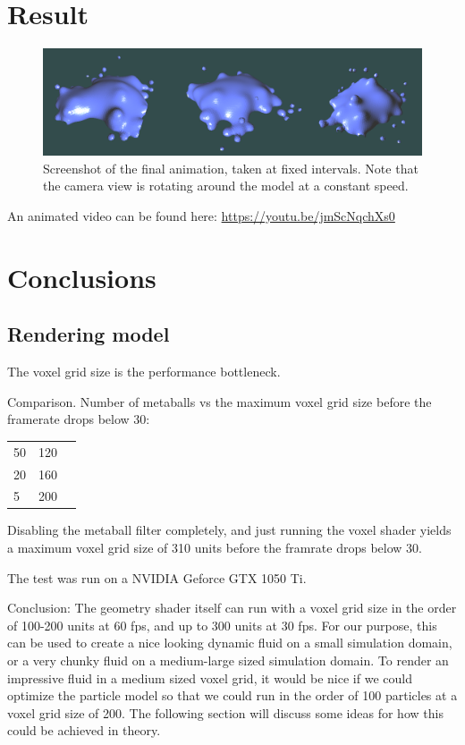 \documentclass{article}
\begin{document}
\begin{multicols}{2}
    \section{Result}
        \begin{figure}[H]
        	\begin{minipage}[b]{0.5\textwidth}
	            \includegraphics[width=\linewidth]{img/result-animation.png}
				\caption{Screenshot of the final animation, taken at fixed intervals. Note that the camera view is rotating around the model at a constant speed.}
				\label{fig:result-animation}
        	\end{minipage}
        \end{figure}
        An animated video can be found here:
        \url{https://youtu.be/jmScNqchXs0}
    \section{Conclusions}
    
        \subsection{Rendering model}
        The voxel grid size is the performance bottleneck.

        Comparison.
        Number of metaballs vs the maximum voxel grid size before the framerate drops below 30:

        \begin{tabular}{ l | c | r }
          50 & 120 \\
          20 & 160 \\
          5 & 200 \\
        \end{tabular}

        Disabling the metaball filter completely, and just running the voxel shader yields a maximum voxel grid size of 310 units before the framrate drops below 30.

        The test was run on a NVIDIA Geforce GTX 1050 Ti.

        Conclusion: The geometry shader itself can run with a voxel grid size in the order of 100-200 units at 60 fps, and up to 300 units at 30 fps.
        For our purpose, this can be used to create a nice looking dynamic fluid on a small simulation domain, or a very chunky fluid on a medium-large sized simulation domain.
        To render an impressive fluid in a medium sized voxel grid, it would be nice if we could optimize the particle model so that we could run in the order of 100 particles at a voxel grid size of 200.
        The following section will discuss some ideas for how this could be achieved in theory.


\end{multicols}
\end{document}
